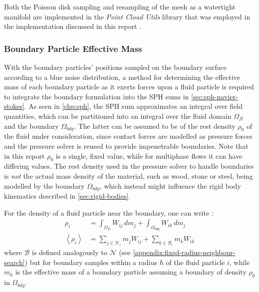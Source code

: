 \documentclass[oneside, a4paper]{book}
\newcounter{phase}[algorithm]
\newcommand\angled[1]{\left\langle#1\right\rangle}
\begin{document}
    Both the Poisson disk sampling and resampling of the mesh as a watertight manifold are implemented in the \textit{Point Cloud Utils} library that was employed in the implementation discussed in this report \autocite{pcu}.

    \subsubsection{Boundary Particle Effective Mass}\label{subsec:bdy-effective-mass}
    With the boundary particles' positions sampled on the boundary surface according to a blue noise distribution, a method for determining the effective mass of each boundary particle as it exerts forces upon a fluid particle is required to integrate the boundary formulation into the SPH sums in \autoref{sec:sph-navier-stokes}. As seen in \autoref{chp:sph}, the SPH sum approximates an integral over field quantities, which can be partitioned into an integral over the fluid domain $\Omega_{fl}$ and the boundary $\Omega_{bdy}$. The latter can be assumed to be of the rest density $\rho_0$ of the fluid under consideration, since contact forces are modelled as pressure forces and the pressure solver is reused to provide impenetrable boundaries. Note that in this report $\rho_0$ is a single, fixed value, while for multiphase flows it can have differing values. The rest density used in the pressure solver to handle boundaries is \textit{not} the actual mass density of the material, such as wood, stone or steel, being modelled by the boundary $\Omega_{bdy}$, which instead might influence the rigid body kinematics described in \autoref{sec:rigid-bodies}.

    For the density of a fluid particle near the boundary, one can write \autocite{density-maps}:
    \begin{align}
      \rho_i &= \int_{\Omega_{fl}} W_{ij} \,dm_j+  \int_{\Omega_{bdy}} W_{ik} \,dm_j\\
      \angled{\rho_i} &= \sum_{j\in\mathcal{N}_i} m_jW_{ij} + \sum_{k\in\mathcal{B}_i} m_k W_{ik}
    \end{align}
    where $\mathcal{B}$ is defined analogously to $\mathcal{N}$ (see \autoref{appendix:fixed-radius-neighbour-search}) but for boundary samples within a radius $\hbar$ of the fluid particle $i$, while $m_k$ is the effective mass of a boundary particle assuming a boundary of density $\rho_0$ in $\Omega_{bdy}$.
\end{document}
